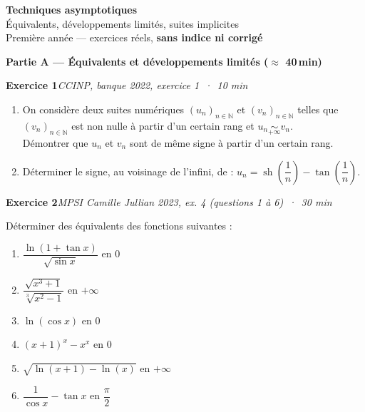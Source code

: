 \documentclass[11pt,a4paper]{article}
\newcommand{\N}{\mathbb{N}}
\newcommand{\sh}{\operatorname{sh}}
\newcommand{\exo}[3]{\vspace{1.2em}\noindent\textbf{\large Exercice #1}\hfill\textit{#2 \,·\, #3}\par\smallskip}
\begin{document}
\begin{center}
{\LARGE\bfseries Techniques asymptotiques}\\[0.3em]
{\large \'Equivalents, d\'eveloppements limit\'es, suites implicites}\\[0.5em]
Premi\`ere ann\'ee --- exercices r\'eels, \textbf{sans indice ni corrig\'e}
\end{center}

\noindent{}

\vspace{0.8em}
\noindent\textbf{Partie A --- \'Equivalents et d\'eveloppements limit\'es (\(\approx\) 40\,min)}

\exo{1}{CCINP, banque 2022, exercice 1}{10 min}
\begin{enumerate}
\item On consid\`ere deux suites num\'eriques $(u_n)_{n\in\N}$ et $(v_n)_{n\in\N}$ telles que $(v_n)_{n\in\N}$ est non nulle \`a partir d'un certain rang et $u_n \underset{+\infty}{\sim} v_n$.\\
D\'emontrer que $u_n$ et $v_n$ sont de m\^eme signe \`a partir d'un certain rang.
\item D\'eterminer le signe, au voisinage de l'infini, de : $u_n=\sh\!\left(\dfrac1n\right)-\tan\!\left(\dfrac1n\right)$.
\end{enumerate}

\exo{2}{MPSI Camille Jullian 2023, ex. 4 (questions 1 \`a 6)}{30 min}
\noindent D\'eterminer des \'equivalents des fonctions suivantes :
\begin{enumerate}
\item $\dfrac{\ln(1+\tan x)}{\sqrt{\sin x}}$ en $0$
\item $\dfrac{\sqrt{x^3+1}}{\sqrt[3]{x^2-1}}$ en $+\infty$
\item $\ln(\cos x)$ en $0$
\item $(x+1)^x-x^x$ en $0$
\item $\sqrt{\ln(x+1)-\ln(x)}$ en $+\infty$
\item $\dfrac{1}{\cos x}-\tan x$ en $\dfrac{\pi}{2}$
\end{enumerate}
\end{document}
